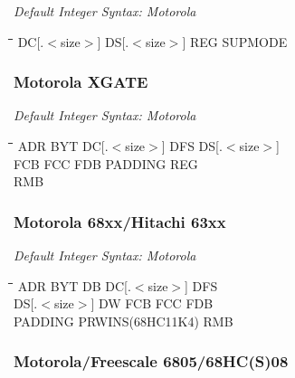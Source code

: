 {\em Default Integer Syntax: Motorola}

{\tt\begin{tabbing}
\hspace{3cm}\=\hspace{3cm}\=\hspace{3cm}\=\hspace{3cm}\=\kill
DC[.$<$size$>$] \> DS[.$<$size$>$] \> REG \> SUPMODE \\
\end{tabbing}}

\subsubsection{Motorola XGATE}

{\em Default Integer Syntax: Motorola}

{\tt\begin{tabbing}
\hspace{3cm}\=\hspace{3cm}\=\hspace{3cm}\=\hspace{3cm}\=\kill
ADR        \> BYT         \> DC[.$<$size$>$] \> DFS     \> DS[.$<$size$>$] \\
FCB        \> FCC         \> FDB         \> PADDING     \> REG \\
RMB \\
\end{tabbing}}

\subsubsection{Motorola 68xx/Hitachi 63xx}

{\em Default Integer Syntax: Motorola}

{\tt\begin{tabbing}
\hspace{3cm}\=\hspace{3cm}\=\hspace{3cm}\=\hspace{3cm}\=\kill
ADR        \> BYT         \> DB          \> DC[.$<$size$>$] \> DFS     \\
DS[.$<$size$>$] \> DW     \> FCB         \> FCC         \> FDB         \\
PADDING     \> PRWINS(68HC11K4) \> RMB \\
\end{tabbing}}

\subsubsection{Motorola/Freescale 6805/68HC(S)08}

